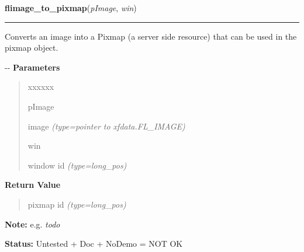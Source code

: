 \hspace{.8\funcindent}\begin{boxedminipage}{\funcwidth}

    \raggedright \textbf{flimage\_to\_pixmap}(\textit{pImage}, \textit{win})

    \vspace{-1.5ex}

    \rule{\textwidth}{0.5\fboxrule}
\setlength{\parskip}{2ex}

Converts an image into a Pixmap (a server side resource) that can be
used in the pixmap object.

-{}-
\setlength{\parskip}{1ex}
      \textbf{Parameters}
      \vspace{-1ex}

      \begin{quote}
        \begin{Ventry}{xxxxxx}

          \item[pImage]


image
            {\it (type=pointer to xfdata.FL\_IMAGE)}

          \item[win]


window id
            {\it (type=long\_pos)}

        \end{Ventry}

      \end{quote}

      \textbf{Return Value}
    \vspace{-1ex}

      \begin{quote}

pixmap id
      {\it (type=long\_pos)}

      \end{quote}

\textbf{Note:} 
e.g. \emph{todo}


\textbf{Status:} 
Untested + Doc + NoDemo = NOT OK


    \end{boxedminipage}

    \label{xformslib:flflimage:flimage_dup}

    \vspace{0.5ex}

